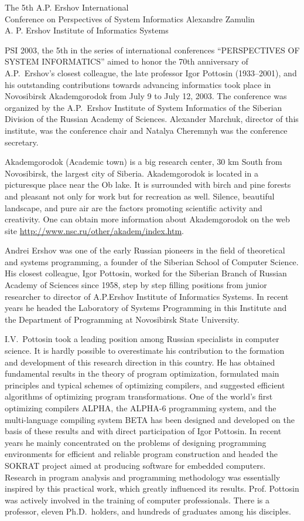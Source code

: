 \documentclass[final]{beatcs}
\begin{document}
 {The 5th A.P. Ershov International\\Conference on
   Perspectives of System Informatics}
 {Alexandre Zamulin\\A. P. Ershov Institute of Informatics Systems}

 PSI 2003, the 5th in the series of international conferences
 ``PERSPECTIVES OF SYSTEM INFORMATICS'' aimed to honor the 70th
 anniversary of A.P.~Ershov's closest colleague, the late professor
 Igor Pottosin (1933--2001), and his outstanding contributions towards
 advancing informatics took place in Novosibirsk Akademgorodok from
 July 9 to July 12, 2003. The conference was organized by the
 A.P.~Ershov Institute of System Informatics of the Siberian Division
 of the Russian Academy of Sciences. Alexander Marchuk, director of
 this institute, was the conference chair and Natalya Cheremnyh was
 the conference secretary. 

 Akademgorodok (Academic town) is a big research center, 30 km South
 from Novosibirsk, the largest city of Siberia. Akademgorodok is
 located in a picturesque place near the Ob lake. It is surrounded
 with birch and pine forests and pleasant not only for work but for
 recreation as well. Silence, beautiful landscape, and pure air are
 the factors promoting scientific activity and creativity. One can
 obtain more information about Akademgorodok on the web site
 \url{http://www.nsc.ru/other/akadem/index.htm}.

 Andrei Ershov was one of the early Russian pioneers in the field of
 theoretical and systems programming, a founder of the Siberian School
 of Computer Science. His closest colleague, Igor Pottosin, worked for
 the Siberian Branch of Russian Academy of Sciences since 1958, step
 by step filling positions from junior researcher to director of
 A.P.Ershov Institute of Informatics Systems. In recent years he
 headed the Laboratory of Systems Programming in this Institute and
 the Department of Programming at Novosibirsk State University. 

 I.V.~Pottosin took a leading position among Russian specialists in
 computer science. It is hardly possible to overestimate his
 contribution to the formation and development of this research
 direction in this country. He has obtained fundamental results in the
 theory of program optimization, formulated main principles and
 typical schemes of optimizing compilers, and suggested efficient
 algorithms of optimizing program transformations. One of the world's
 first optimizing compilers ALPHA, the ALPHA-6 programming system, and
 the multi-language compiling system BETA has been designed and
 developed on the basis of these results and with direct participation
 of Igor Pottosin. In recent years he mainly concentrated on the
 problems of designing programming environments for efficient and
 reliable program construction and headed the SOKRAT project aimed at
 producing software for embedded computers. Research in program
 analysis and programming methodology was essentially inspired by this
 practical work, which greatly influenced its results. Prof. Pottosin
 was actively involved in the training of computer
 professionals. There is a professor, eleven Ph.D.\ holders, and
 hundreds of graduates among his disciples.
\end{document}
